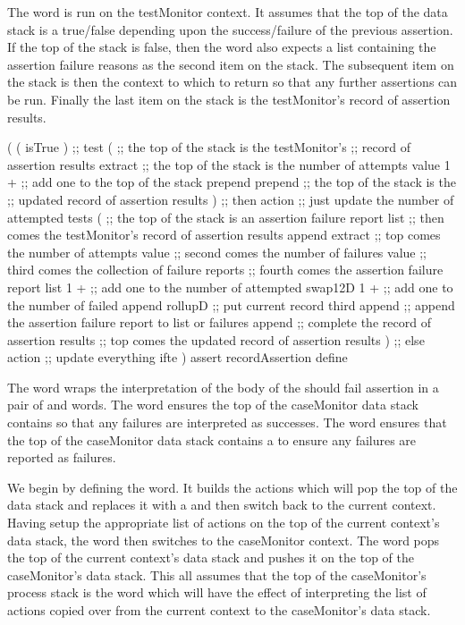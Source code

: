 
The  word is run on the testMonitor context. It 
assumes that the top of the data stack is a true/false depending upon the 
success/failure of the previous assertion. If the top of the stack is 
false, then the  word also expects a list containing 
the assertion failure reasons as the second item on the stack. The 
subsequent item on the stack is then the context to which to return so 
that any further assertions can be run. Finally the last item on the stack 
is the testMonitor's record of assertion results. 

\startJoylolCode
(
  (
    isTrue
  )  ;; test
  (
    ;; the top of the stack is the testMonitor's
    ;; record of assertion results
    extract
    ;; the top of the stack is the number of attempts value
    1 + ;; add one to the top of the stack
    prepend
    prepend
    ;; the top of the stack is the
    ;; updated record of assertion results
  )  ;; then action ;; just update the number of attempted tests 
  (
    ;; the top of the stack is an assertion failure report list
    ;; then comes the testMonitor's record of assertion results
    append
    extract
    ;; top    comes the number of attempts value
    ;; second comes the number of failures value
    ;; third  comes the collection of failure reports
    ;; fourth comes the assertion failure report list
    1 + ;; add one to the number of attempted
    swap12D
    1 + ;; add one to the number of failed
    append
    rollupD ;; put current record third
    append  ;; append the assertion failure report to list or failures
    append  ;; complete the record of assertion results
    ;; top comes the updated record of assertion results
  )  ;; else action ;; update everything
  ifte
)
assert
recordAssertion
define
\stopJoylolCode
\stopTestSuite

\startTestSuite[assertShouldFail]

The  word wraps the interpretation of the body of 
the should fail assertion in a pair of  and 
 words. The  word ensures 
the top of the caseMonitor data stack contains  so that any 
failures are interpreted as successes. The  word 
ensures that the top of the caseMonitor data stack contains a  
to ensure any failures are reported as failures. 

We begin by defining the  word. It builds the 
actions which will pop the top of the data stack and replaces it with a 
 and then switch back to the current context. Having setup the 
appropriate list of actions on the top of the current context's data 
stack, the  word then switches to the caseMonitor 
context. The  word pops the top of the current context's 
data stack and pushes it on the top of the caseMonitor's data stack. This 
all assumes that the top of the caseMonitor's process stack is the 
 word which will have the effect of interpreting the list 
of actions copied over from the current context to the caseMonitor's data 
stack. 

